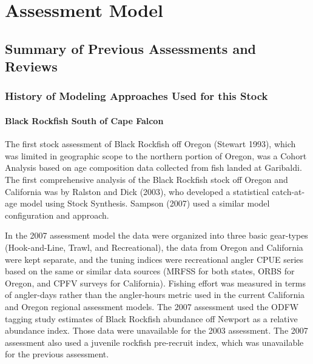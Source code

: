 \documentclass[11pt,
  letterpaper,
]{article}
\begin{document}
\hypertarget{assessment-model}{%
\section{Assessment Model}\label{assessment-model}}

\hypertarget{summary-of-previous-assessments-and-reviews}{%
\subsection{Summary of Previous Assessments and Reviews}\label{summary-of-previous-assessments-and-reviews}}

\hypertarget{history-of-modeling-approaches-used-for-this-stock}{%
\subsubsection{History of Modeling Approaches Used for this Stock}\label{history-of-modeling-approaches-used-for-this-stock}}

\hypertarget{black-rockfish-south-of-cape-falcon}{%
\paragraph{Black Rockfish South of Cape Falcon}\label{black-rockfish-south-of-cape-falcon}}

The first stock assessment of Black Rockfish off Oregon (Stewart 1993), which was limited in geographic scope to the northern portion of Oregon, was a Cohort Analysis based on age composition data collected from fish landed at Garibaldi. The first comprehensive analysis of the Black Rockfish stock off Oregon and California was by Ralston and Dick (2003), who developed a statistical catch-at-age model using Stock Synthesis. Sampson (2007) used a similar model configuration and approach.

In the 2007 assessment model the data were organized into three basic gear-types (Hook-and-Line, Trawl, and Recreational), the data from Oregon and California were kept separate, and the tuning indices were recreational angler CPUE series based on the same or similar data sources (MRFSS for both states, ORBS for Oregon, and CPFV surveys for California). Fishing effort was measured in terms of angler-days rather than the angler-hours metric used in the current California and Oregon regional assessment models. The 2007 assessment used the ODFW tagging study estimates of Black Rockfish abundance off Newport as a relative abundance index. Those data were unavailable for the 2003 assessment. The 2007 assessment also used a juvenile rockfish pre-recruit index, which was unavailable for the previous assessment.
\end{document}

